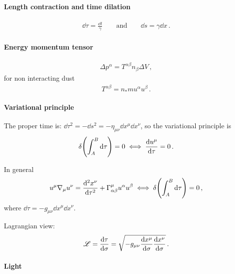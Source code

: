 \documentclass[main.tex]{subfiles}
\begin{document}
\paragraph{Length contraction and time dilation}

\begin{align}
\dd{\tau } = \frac{ \dd{t}}{\gamma } 
\qquad \text{and} \qquad
\dd{s} = \gamma \dd{x}
\,.
\end{align}



\paragraph{Energy momentum tensor}

\begin{align}
\Delta p^{\alpha } = T^{\alpha \beta } n_{\beta } \Delta V
\,,
\end{align}
%
for non interacting dust 
%
\begin{align}
T^{\alpha \beta } = n_{*} m u^{\alpha } u^{\beta }
\,.
\end{align}


\paragraph{Variational principle}

The proper time is:
\(\dd{\tau }^2 = - \dd{s^2} = -\eta_{\mu \nu } \dd{x^{\mu}} \dd{x^{\nu }} \), so the variational principle is 
%
\begin{align}
\delta \qty(\int_{A}^{B} \dd{\tau }) = 0 
\iff 
\dv{ u^{\mu}}{\tau} = 0
\,.
\end{align}

In general 
%
\begin{align}
u^{\mu } \nabla_{\mu } u^{\nu } = \dv[2]{x^{\nu }}{\tau } 
+ \Gamma^{\mu }_{\alpha \beta } u^{\alpha} u^{\beta }
\iff 
\delta \qty(\int_{A}^{B} \dd{\tau }) = 0
\,,
\end{align}
%
where \(\dd{\tau } = - g_{\mu \nu } \dd{x^{\mu }} \dd{x^{\nu }}\).

Lagrangian view: 
%
\begin{align}
\mathscr{L} = \dv{\tau }{\sigma }= \sqrt{- g_{\mu \nu } \dv{x^{\mu }}{\sigma } \dv{x^{\nu }}{\sigma }}
\,.
\end{align}

\paragraph{Light}
\end{document}
